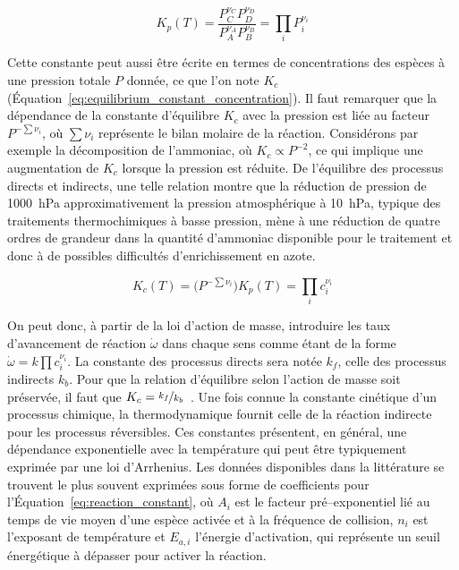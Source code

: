 \begin{equation}
  K_{p}(T)=
  \frac{P_{C}^{\nu_{C}}P_{D}^{\nu_{D}}}{P_{A}^{\nu_{A}}P_{B}^{\nu_{B}}}=
  \prod_{i}P_{i}^{\nu_{i}}
  \label{eq:equilibrium_constant}
\end{equation}

Cette constante peut aussi être écrite en termes de concentrations des espèces à une pression totale $P$ donnée, ce que l'on note $K_{c}$ (Équation~\ref{eq:equilibrium_constant_concentration}).  Il faut remarquer que la dépendance de la constante d'équilibre $K_{c}$ avec la pression est liée au facteur $P^{-\sum\nu_{i}}$, où $\sum\nu_{i}$ représente le bilan molaire de la réaction. Considérons par exemple la décomposition de l'ammoniac, où $K_{c}\propto P^{-2}$, ce qui implique une augmentation de $K_{c}$ lorsque la pression est réduite. De l'équilibre des processus directs et indirects, une telle relation montre que la réduction de pression de \SI{1000}{\hecto\pascal} \textendash{} approximativement la pression atmosphérique \textendash{} à \SI{10}{\hecto\pascal}, typique des traitements thermochimiques à basse pression, mène à une réduction de quatre ordres de grandeur dans la quantité d'ammoniac disponible pour le traitement et donc à de possibles difficultés d'enrichissement en azote.

\begin{equation}
  K_{c}(T)=
  \big(P^{-\sum\nu_{i}}\big)K_{p}(T)=
  \prod_{i}c_{i}^{\nu_{i}}
  \label{eq:equilibrium_constant_concentration}
\end{equation}

On peut donc, à partir de la loi d'action de masse, introduire les taux d'avancement de réaction $\dot{\omega}$ dans chaque sens comme étant de la forme $\dot{\omega}=k\prod c_{i}^{\nu_{i}}$. La constante des processus directs sera notée $k_{f}$, celle des processus indirects $k_{b}$. Pour que la relation d'équilibre selon l'action de masse soit préservée, il faut que $K_{c}=\nicefrac{k_{f}}{k_{b}}$~\cite{Landau1980,Stolen2004}.  Une fois connue la constante cinétique d'un processus chimique, la thermodynamique fournit celle de la réaction indirecte \textemdash{} pour les processus réversibles. Ces constantes présentent, en général, une dépendance exponentielle avec la température qui peut être typiquement exprimée par une loi d'Arrhenius. Les données disponibles dans la littérature se trouvent le plus souvent exprimées sous forme de coefficients pour l'Équation~\ref{eq:reaction_constant}, où $A_{i}$ est le facteur pré--exponentiel lié au temps de vie moyen d'une espèce activée et à la fréquence de collision, $n_{i}$ est l'exposant de température et $E_{a,i}$ l'énergie d'activation, qui représente un seuil énergétique à dépasser pour activer la réaction.

